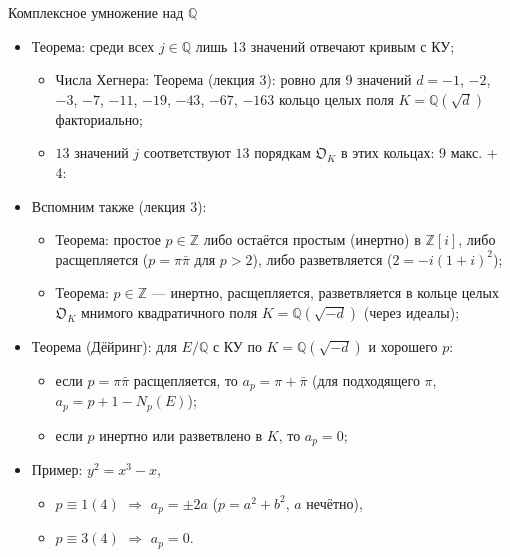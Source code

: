 \documentclass[serif, aspectratio=169]{beamer}
\begin{document}
\begin{frame}{Комплексное умножение над $\mathbb{Q}$}
    \begin{itemize}
        \item Теорема: среди всех $j\in\mathbb{Q}$ лишь 13 значений отвечают кривым с КУ;
        \begin{itemize}
            \item Числа Хегнера: Теорема (лекция 3): ровно для 9 значений $d=-1$, $-2$, $-3$, $-7$, $-11$, $-19$, $-43$, $-67$, $-163$ кольцо целых поля $K=\mathbb{Q}(\sqrt d)$ факториально;
            \item $13$ значений $j$ соответствуют $13$ порядкам $\mathfrak{O}_K$ в этих кольцах: 9 макс. + 4:\\
        \end{itemize}
        \item Вспомним также (лекция 3):
        \begin{itemize}
            \item Теорема: простое $p\in\mathbb{Z}$ либо остаётся простым (инертно) в $\mathbb{Z}[i]$, либо расщепляется ($p=\pi\bar\pi$ для $p>2$), либо разветвляется ($2=-i(1+i)^2$);
        \item Теорема: $p\in\mathbb{Z}$ --- инертно, расщепляется, разветвляется в кольце целых $\mathfrak{O}_K$ мнимого квадратичного поля $K=\mathbb{Q}(\sqrt{-d})$ (через идеалы);
        \end{itemize}
        \item Теорема (Дёйринг): для $E/\mathbb{Q}$ с КУ по $K=\mathbb{Q}(\sqrt{-d})$ и хорошего $p$:
        \begin{itemize}
            \item если $p=\pi\bar\pi$ расщепляется, то $a_p=\pi+\bar\pi$ (для подходящего $\pi$, $a_p=p+1-N_p(E)$);
            \item если $p$ инертно или разветвлено в $K$, то $a_p=0$;
        \end{itemize}
        \item Пример: $y^2=x^3-x$,
        \begin{itemize}[<.->]
            \item $p\equiv 1(4)$ $\Rightarrow$ $a_p=\pm2a$ ($p=a^2+b^2$, $a$ нечётно),
            \item $p\equiv 3(4)$ $\Rightarrow$ $a_p=0$.
        \end{itemize}    

\end{itemize}
\end{frame}
\end{document}
